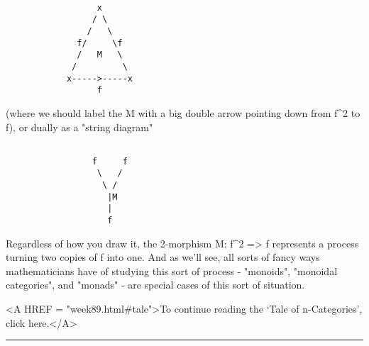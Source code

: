\begin{verbatim}

                  x
                 / \
                /   \ 
              f/     \f
              /   M   \
             /         \
            x----->-----x
                  f

\end{verbatim}
    
(where we should label the M with a big double arrow pointing down from
f^{2} to f), or dually as a "string diagram"
       

\begin{verbatim}

                 f     f
                  \   /
                   \ /
                    |M
                    |
                    f

\end{verbatim}
    
Regardless of how you draw it, the 2-morphism M: f^{2} => f represents
a process turning two copies of f into one.  And as we'll see, all
sorts of fancy ways mathematicians have of studying this sort of
process - "monoids", "monoidal categories", and "monads" - are
special cases of this sort of situation.   

<A HREF = "week89.html#tale">To continue reading the `Tale of
n-Categories', click here.</A>
\par\noindent\rule{\textwidth}{0.4pt}

